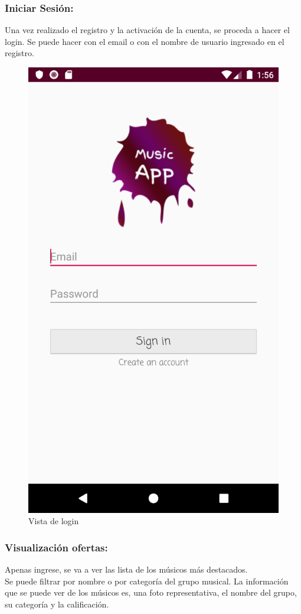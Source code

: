 \subsubsection{Iniciar Sesión:}
Una vez realizado el registro y la activación de la cuenta, se proceda a hacer el login. Se puede hacer con el email o con el nombre de usuario ingresado en el registro.
\begin{figure}[h!]
 \centering
\includegraphics[width=0.6\linewidth]{Desarrollo/Interfaces/Interfaces/imgs/login.png}
\caption{Vista de login}
\end{figure}

\newpage

\subsubsection{Visualización ofertas:}

Apenas ingrese, se va a ver las lista de los músicos más destacados. \\

Se puede filtrar por nombre o por categoría del grupo musical. La información que se puede ver de los músicos es, una foto representativa, el nombre del grupo, su categoría y la calificación. \\


